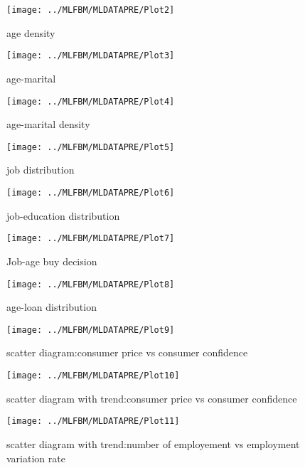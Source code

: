 \documentclass[12pt, a4paper, bibliography=totoc, english]{scrartcl}
\begin{document}
\begin{figure}
	\centering
	\texttt{[image: ../MLFBM/MLDATAPRE/Plot2]}
	\caption{age density}
	\label{fig:plot2}
\end{figure}

\begin{figure}
	\centering
	\texttt{[image: ../MLFBM/MLDATAPRE/Plot3]}
	\caption{age-marital}
	\label{fig:plot3}
\end{figure}

\begin{figure}
	\centering
	\texttt{[image: ../MLFBM/MLDATAPRE/Plot4]}
	\caption{age-marital density}
	\label{fig:plot4}
\end{figure}

\begin{figure}
	\centering
	\texttt{[image: ../MLFBM/MLDATAPRE/Plot5]}
	\caption{job distribution}
	\label{fig:plot5}
\end{figure}

\begin{figure}
	\centering
	\texttt{[image: ../MLFBM/MLDATAPRE/Plot6]}
	\caption{job-education distribution}
	\label{fig:plot6}
\end{figure}

\begin{figure}
	\centering
	\texttt{[image: ../MLFBM/MLDATAPRE/Plot7]}
	\caption{Job-age buy decision}
	\label{fig:plot7}
\end{figure}

\begin{figure}
	\centering
	\texttt{[image: ../MLFBM/MLDATAPRE/Plot8]}
	\caption{age-loan distribution}
	\label{fig:plot8}
\end{figure}

\begin{figure}
	\centering
	\texttt{[image: ../MLFBM/MLDATAPRE/Plot9]}
	\caption{scatter diagram:consumer price vs consumer confidence}
	\label{fig:plot9}
\end{figure}
\begin{figure}
	\centering
	\texttt{[image: ../MLFBM/MLDATAPRE/Plot10]}
	\caption{scatter diagram with trend:consumer price vs consumer confidence}
	\label{fig:plot10}
\end{figure}

\begin{figure}
	\centering
	\texttt{[image: ../MLFBM/MLDATAPRE/Plot11]}
	\caption{scatter diagram with trend:number of employement vs employment variation rate}
	\label{fig:plot11}
\end{figure}
\end{document}
